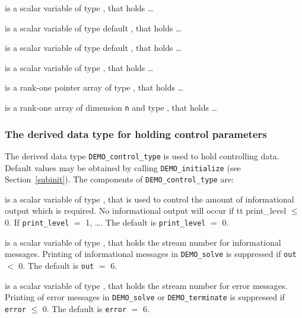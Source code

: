 \documentclass{galahad}
\newcommand{\packagename}{DEMO}
\begin{document}
\begin{description}

 is a scalar variable of type \integer, that holds \ldots

 is a scalar variable of type default \logical, that holds \ldots

 is a scalar variable of type default \real, that holds \ldots

 is a scalar variable of type \realdp, that holds \ldots

 is a rank-one pointer array of type \realdp, that holds \ldots

 is a rank-one array of dimension {\tt n} and type 
\realdp, that holds \ldots

\end{description}


\subsubsection{The derived data type for holding control 
 parameters}\label{typecontrol}
The derived data type 
{\tt \packagename\_control\_type} 
is used to hold controlling data. Default values may be obtained by calling 
{\tt \packagename\_initialize}
(see Section~\ref{subinit}). The components of 
{\tt \packagename\_control\_type} 
are:

\begin{description}

 is a scalar variable of type \integer, that is used
to control the amount of informational output which is required. No 
informational output will occur if {tt print\_level} $\leq$ 0. If 
{\tt print\_level} $=$ 1, \ldots .
The default is {\tt print\_level} $=$ 0.

 is a scalar variable of type \integer, that holds the
stream number for informational messages.
Printing of informational messages in 
{\tt \packagename\_solve}
is suppressed if {\tt out} $<$ 0.
The default is {\tt out} $=$ 6.

 is a scalar variable of type \integer, that holds the
stream number for error messages.
Printing of error messages in 
{\tt \packagename\_solve}
or 
{\tt \packagename\_terminate}
is suppressed if {\tt error} $\leq$ 0.
The default is {\tt error} $=$ 6.

\end{description}
\end{document}
